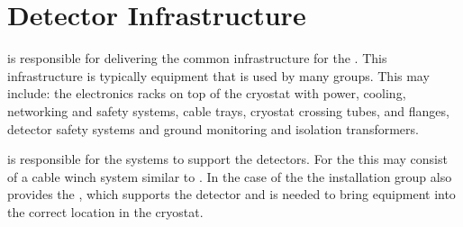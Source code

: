 \section{Detector Infrastructure}
\label{sec:fdsp-coord-infrastructure}

 is responsible for delivering the common infrastructure for
the . This infrastructure is typically equipment that is used
by many groups. This may include: the electronics racks on top of the
cryostat with power, cooling, networking and safety systems, cable
trays, cryostat crossing tubes, and flanges, detector safety systems
and ground monitoring and isolation transformers.

 is responsible for the systems to support the
detectors. For the  this may consist of a cable
winch system similar to .  In the case of the
 the installation group also provides the
, which supports the detector and is needed to bring
equipment into the correct location in the cryostat.
